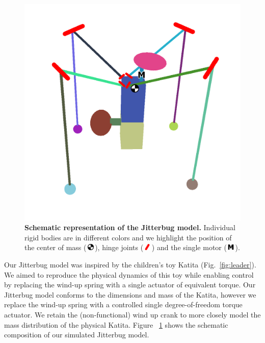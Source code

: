 \documentclass[letterpaper, 10 pt, conference]{ieeeconf}
\newcommand{\com}{\,\includegraphics[width=9pt]{ico-com}\,}
\newcommand{\hinge}{\,\includegraphics[width=9pt]{ico-hinge}\,}
\newcommand{\motor}{\,\includegraphics[width=9pt]{ico-motor}\,}
\begin{document}
\begin{figure}[t]
    \centering
    \includegraphics[width=\linewidth]{fig-jitterbug-parts}
    \caption[
        Schematic representation of the Jitterbug model.
        Individual rigid bodies are in different colors and we highlight the position of the center of mass, hinge joints and the single motor.
    ]{
        \textbf{Schematic representation of the Jitterbug model.}
        Individual rigid bodies are in different colors and we highlight the position of the center of mass (\protect\com), hinge joints  (\protect\hinge) and the single motor (\protect\motor).
    }
    \label{fig:parts}
\end{figure}

Our Jitterbug model was inspired by the children's toy Katita (Fig.~\ref{fig:leader}).
We aimed to reproduce the physical dynamics of this toy while enabling control by replacing the wind-up spring with a single actuator of equivalent torque.
Our Jitterbug model conforms to the dimensions and mass of the Katita, however we replace the wind-up spring with a controlled single degree-of-freedom torque actuator.
We retain the (non-functional) wind up crank to more closely model the mass distribution of the physical Katita.
Figure ~\ref{fig:parts} shows the schematic composition of our simulated Jitterbug model.
\end{document}
